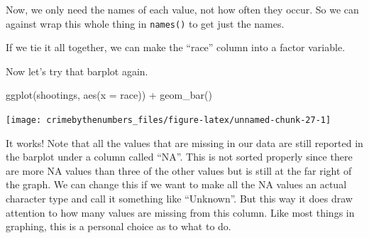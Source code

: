 \documentclass[
  12pt,
]{book}
\newenvironment{Shaded}{\begin{snugshade}}{\end{snugshade}}
\newcommand{\AttributeTok}[1]{\textcolor[rgb]{0.61,0.61,0.61}{#1}}
\newcommand{\CommentTok}[1]{\textcolor[rgb]{0.37,0.37,0.37}{\textit{#1}}}
\newcommand{\ConstantTok}[1]{\textcolor[rgb]{0,0,0}{#1}}
\newcommand{\FunctionTok}[1]{\textcolor[rgb]{0,0,0}{#1}}
\newcommand{\NormalTok}[1]{#1}
\newcommand{\OtherTok}[1]{\textcolor[rgb]{0.37,0.37,0.37}{#1}}
\newcommand{\SpecialCharTok}[1]{\textcolor[rgb]{0,0,0}{#1}}
\begin{document}
Now, we only need the names of each value, not how often they occur. So we can against wrap this whole thing in \texttt{names()} to get just the names.

\begin{Shaded}
\end{Shaded}

If we tie it all together, we can make the ``race'' column into a factor variable.

\begin{Shaded}
\end{Shaded}

Now let's try that barplot again.

\begin{Shaded}
\begin{Highlighting}[]
\FunctionTok{ggplot}\NormalTok{(shootings, }\FunctionTok{aes}\NormalTok{(}\AttributeTok{x =}\NormalTok{ race)) }\SpecialCharTok{+} 
  \FunctionTok{geom\_bar}\NormalTok{() }
\end{Highlighting}
\end{Shaded}

\begin{center}\texttt{[image: crimebythenumbers\_files/figure-latex/unnamed-chunk-27-1]} \end{center}

It works! Note that all the values that are missing in our data are still reported in the barplot under a column called ``NA''. This is not sorted properly since there are more NA values than three of the other values but is still at the far right of the graph. We can change this if we want to make all the NA values an actual character type and call it something like ``Unknown''. But this way it does draw attention to how many values are missing from this column. Like most things in graphing, this is a personal choice as to what to do.
\end{document}

